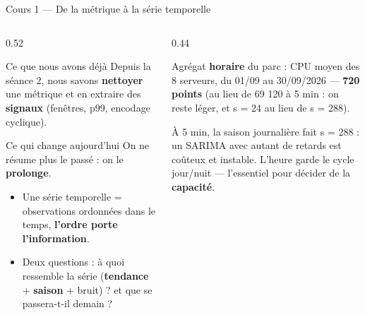 \begin{frame}{Cours 1 --- De la métrique à la série temporelle}
\begin{columns}[t]
\begin{column}{0.52\textwidth}
\begin{block}{Ce que nous avons déjà}
Depuis la séance 2, nous savons \textbf{nettoyer} une métrique et en
extraire des \textbf{signaux} (fenêtres, p99, encodage cyclique).
\end{block}
\begin{block}{Ce qui change aujourd'hui}
On ne résume plus le passé : on le \textbf{prolonge}.
\begin{itemize}
\item Une série temporelle = observations ordonnées dans le temps,
\textbf{l'ordre porte l'information}.
\item Deux questions : à quoi ressemble la série
(\textbf{tendance} + \textbf{saison} + bruit) ? et que se passera-t-il
demain ?
\end{itemize}
\end{block}
\end{column}
\begin{column}{0.44\textwidth}
\begin{ebox}
Agrégat \textbf{horaire} du parc : CPU moyen des 8 serveurs, du 01/09 au
30/09/2026 --- \textbf{720 points} (au lieu de 69 120 à 5 min : on
reste léger, et s = 24 au lieu de s = 288).
\end{ebox}
\begin{wbox}
À 5 min, la saison journalière fait s = 288 : un SARIMA avec autant de
retards est coûteux et instable. L'heure garde le cycle jour/nuit ---
l'essentiel pour décider de la \textbf{capacité}.
\end{wbox}
\end{column}
\end{columns}
\end{frame}

